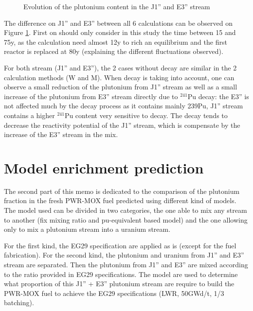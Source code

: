 \documentclass[10pt]{article}
\begin{document}
\begin{figure}[h!]
    \centering
    \caption{Evolution of the plutonium content in the J1'' and  E3'' stream\label{fig:MW_flow} }
\end{figure}

The difference on J1'' and E3'' between all 6 calculations can be observed on
Figure \ref{fig:MW_flow}. First on should only consider in this study the time
between 15 and 75y, as the calculation need almost 12y to rich an equilibrium
and the first reactor is replaced at 80y (explaining the different fluctuations
observed). 

For both stream (J1'' and E3''), the 2 cases without decay are similar in the 2
calculation methods (W and M). When decay is taking into account, one can
observe a small reduction of the plutonium from  J1'' stream as well as a small
increase of the plutonium from E3'' stream directly due to $^{241}$Pu decay: the E3''
is not affected much by the decay process as it contains mainly 239Pu, J1''
stream contains a higher $^{241}$Pu content very sensitive to decay.  The decay tends
to decrease the reactivity potential of the J1'' stream, which is compensate by
the increase of the E3'' stream in the mix.


\section{Model enrichment prediction}

The second part of this memo is dedicated to the comparison of the plutonium
fraction in the fresh PWR-MOX fuel predicted using different kind of models. The
model used can be divided in two categories, the one able to mix any stream to
another (fix mixing ratio and pu-equivalent based model) and the one allowing
only to mix a plutonium stream into a uranium stream.  

For the first kind, the EG29 specification are applied as is (except for the
fuel fabrication). For the second kind, the plutonium and uranium from J1'' and
E3'' stream are separated.  Then the plutonium from J1'' and E3'' are mixed
according to the ratio provided in EG29 specifications. The model are used to
determine what proportion of this J1'' + E3'' plutonium stream are require to
build the PWR-MOX fuel to achieve the EG29 specifications (LWR, 50GWd/t, 1/3
batching).
\end{document}
